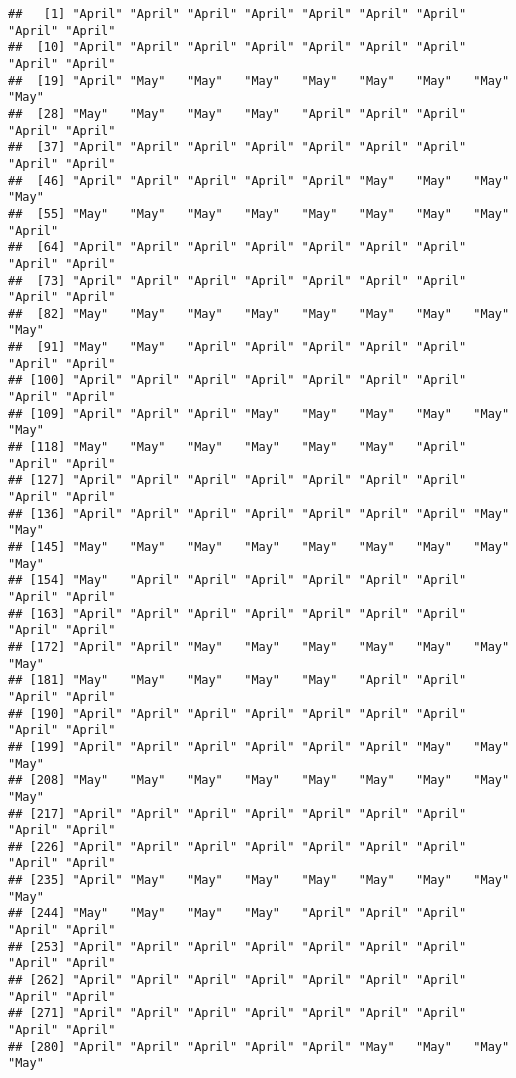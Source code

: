 \documentclass[
]{article}
\begin{document}
\begin{verbatim}
##   [1] "April" "April" "April" "April" "April" "April" "April" "April" "April"
##  [10] "April" "April" "April" "April" "April" "April" "April" "April" "April"
##  [19] "April" "May"   "May"   "May"   "May"   "May"   "May"   "May"   "May"  
##  [28] "May"   "May"   "May"   "May"   "April" "April" "April" "April" "April"
##  [37] "April" "April" "April" "April" "April" "April" "April" "April" "April"
##  [46] "April" "April" "April" "April" "April" "May"   "May"   "May"   "May"  
##  [55] "May"   "May"   "May"   "May"   "May"   "May"   "May"   "May"   "April"
##  [64] "April" "April" "April" "April" "April" "April" "April" "April" "April"
##  [73] "April" "April" "April" "April" "April" "April" "April" "April" "April"
##  [82] "May"   "May"   "May"   "May"   "May"   "May"   "May"   "May"   "May"  
##  [91] "May"   "May"   "April" "April" "April" "April" "April" "April" "April"
## [100] "April" "April" "April" "April" "April" "April" "April" "April" "April"
## [109] "April" "April" "April" "May"   "May"   "May"   "May"   "May"   "May"  
## [118] "May"   "May"   "May"   "May"   "May"   "May"   "April" "April" "April"
## [127] "April" "April" "April" "April" "April" "April" "April" "April" "April"
## [136] "April" "April" "April" "April" "April" "April" "April" "May"   "May"  
## [145] "May"   "May"   "May"   "May"   "May"   "May"   "May"   "May"   "May"  
## [154] "May"   "April" "April" "April" "April" "April" "April" "April" "April"
## [163] "April" "April" "April" "April" "April" "April" "April" "April" "April"
## [172] "April" "April" "May"   "May"   "May"   "May"   "May"   "May"   "May"  
## [181] "May"   "May"   "May"   "May"   "May"   "April" "April" "April" "April"
## [190] "April" "April" "April" "April" "April" "April" "April" "April" "April"
## [199] "April" "April" "April" "April" "April" "April" "May"   "May"   "May"  
## [208] "May"   "May"   "May"   "May"   "May"   "May"   "May"   "May"   "May"  
## [217] "April" "April" "April" "April" "April" "April" "April" "April" "April"
## [226] "April" "April" "April" "April" "April" "April" "April" "April" "April"
## [235] "April" "May"   "May"   "May"   "May"   "May"   "May"   "May"   "May"  
## [244] "May"   "May"   "May"   "May"   "April" "April" "April" "April" "April"
## [253] "April" "April" "April" "April" "April" "April" "April" "April" "April"
## [262] "April" "April" "April" "April" "April" "April" "April" "April" "April"
## [271] "April" "April" "April" "April" "April" "April" "April" "April" "April"
## [280] "April" "April" "April" "April" "April" "May"   "May"   "May"   "May"  

\end{verbatim}
\end{document}
